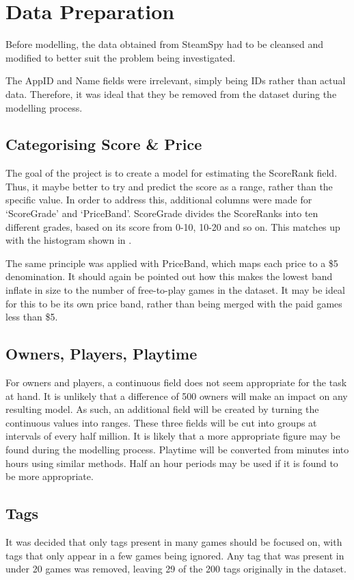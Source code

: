 \documentclass[preparation.tex]{subfiles}
\begin{document}
\section{Data Preparation} %
\label{sec:preparation}
Before modelling, the data obtained from SteamSpy had to be cleansed and
modified to better suit the problem being investigated.

The AppID and Name fields were irrelevant, simply being IDs rather than actual
data. Therefore, it was ideal that they be removed from the dataset during the
modelling process.

\subsection{Categorising Score \& Price} %
\label{sub:categorising_score_price}
The goal of the project is to create a model for estimating the ScoreRank
field. Thus, it maybe better to try and predict the score as a range, rather
than the specific value. In order to address this, additional columns were made
for `ScoreGrade' and `PriceBand'. ScoreGrade divides the ScoreRanks into ten
different grades, based on its score from 0-10, 10-20 and so on. This matches
up with the histogram shown in .

The same principle was applied with PriceBand, which maps each price to a \$5
denomination. It should again be pointed out how this makes the lowest band
inflate in size to the number of free-to-play games in the dataset. It may be
ideal for this to be its own price band, rather than being merged with the paid
games less than \$5.

\subsection{Owners, Players, Playtime} %
\label{sub:owners_players_playtime}
For owners and players, a continuous field does not seem appropriate for the
task at hand. It is unlikely that a difference of 500 owners will make an
impact on any resulting model. As such, an additional field will be created by
turning the continuous values into ranges. These three fields will be cut into
groups at intervals of every half million. It is likely that a more appropriate
figure may be found during the modelling process. Playtime will be converted
from minutes into hours using similar methods. Half an hour periods may be used
if it is found to be more appropriate.

\subsection{Tags} %
\label{sub:tags}
It was decided that only tags present in many games should be focused on, with
tags that only appear in a few games being ignored. Any tag that was present in
under 20 games was removed, leaving 29 of the 200 tags originally in the
dataset.
\end{document}
